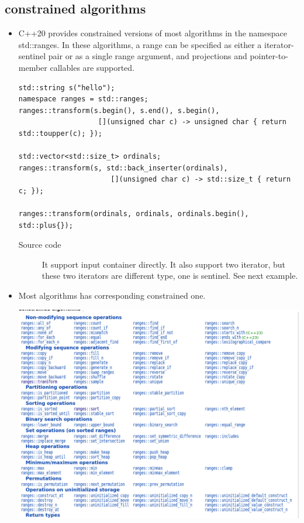 \documentclass[a4paper,11pt,twoside]{book}
\begin{document}
\subsection{constrained algorithms}
\begin{itemize}
		\item C++20 provides constrained versions of most algorithms in the namespace std::ranges. In these algorithms, a range can be specified as either a iterator-sentinel pair or as a single range argument, and projections and pointer-to-member callables are supported. 
\begin{lstlisting}
std::string s("hello");
namespace ranges = std::ranges;
ranges::transform(s.begin(), s.end(), s.begin(),
                   [](unsigned char c) -> unsigned char { return std::toupper(c); });
 
std::vector<std::size_t> ordinals;
ranges::transform(s, std::back_inserter(ordinals),
                      [](unsigned char c) -> std::size_t { return c; });
 
ranges::transform(ordinals, ordinals, ordinals.begin(), std::plus{});
\end{lstlisting}
\begin{description}
		\item[Source code] It support input container directly. It also support two iterator, but these two iterators are different type, one is sentinel. See next example.
\end{description}

\item Most algorithms has corresponding constrained one.
\begin{center}
	\includegraphics[width=0.96\linewidth]{pics/ca.png}
\end{center}


\end{itemize}
\end{document}
